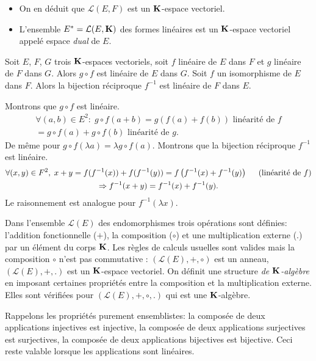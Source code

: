 \begin{rems}
\begin{itemize}
  \item On en déduit que $\mathcal{L}(E,F)$ est un $\mathbf{K}$-espace vectoriel.
  \item L'ensemble $E^* = \mathcal{L}(E,\mathbf{K})$ des formes linéaires est un $\mathbf{K}$-espace vectoriel appelé espace \emph{dual}  de $E$.
\end{itemize}
\end{rems}

\begin{prop}
  Soit $E$, $F$, $G$ trois $\mathbf{K}$-espaces vectoriels, soit $f$ linéaire de $E$ dans $F$ et $g$ linéaire de $F$ dans $G$. Alors $g\circ f$ est linéaire de $E$ dans $G$.\newline
  Soit $f$ un isomorphisme de $E$ dans $F$. Alors la bijection réciproque $f^{-1}$ est linéaire de $F$ dans $E$.
\end{prop}
\begin{demo}
Montrons que $g \circ f$ est linéaire.
\begin{multline*}
 \forall (a,b) \in E^2: \; g\circ f(a+b) = g\left( f(a) + f(b)\right) \text{ linéarité de } f \\
  = g\circ f(a) + g\circ f(b) \text{ linéarité de } g. 
\end{multline*}
De même pour $g\circ f(\lambda a) = \lambda g\circ f (a)$.\newline 
  Montrons que la bijection réciproque $f^{-1}$ est linéaire. 
\begin{multline*}
 \forall(x,y)\in F^2, \; x + y = f(f^{-1}(x)) + f(f^{-1}(y)) = f\left( f^{-1}(x) + f^{-1}(y)\right)\hspace{0.5cm}(\text{linéarité de } f) \\
 \Rightarrow f^{-1}(x+y) = f^{-1}(x) + f^{-1}(y).
\end{multline*}
Le raisonnement est analogue pour $f^{-1}(\lambda x)$.
\end{demo}
\begin{rem}
 Dans l'ensemble $\mathcal{L}(E)$ des endomorphismes trois opérations sont définies: l'addition fonctionnelle ($+$), la composition ($\circ$) et une multiplication externe ($.$) par un élément du corps $\mathbf{K}$. Les règles de calculs usuelles sont valides mais la composition $\circ$ n'est pas commutative : $(\mathcal{L}(E),+,\circ)$ est un anneau, $(\mathcal{L}(E),+,.)$ est un $\mathbf{K}$-espace vectoriel. On définit une structure \emph{de $\mathbf{K}$-algèbre}  en imposant certaines propriétés entre la composition et la multiplication externe. Elles sont vérifiées pour $(\mathcal{L}(E),+,\circ, .)$ qui est une $\mathbf{K}$-algèbre.
\end{rem}
 \begin{rem}
   Rappelons les propriétés purement ensemblistes: la composée de deux applications injectives est injective, la composée de deux applications surjectives est surjectives, la composée de deux applications bijectives est bijective. Ceci reste valable lorsque les applications sont linéaires.
 \end{rem}

